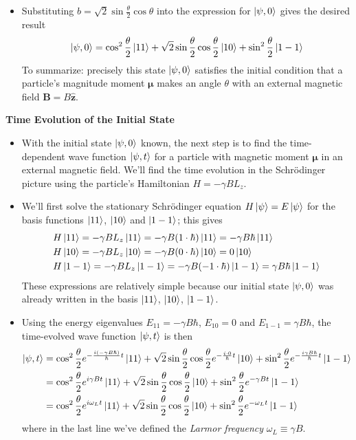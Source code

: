 \documentclass[11pt, a4paper]{article}
\newcommand{\schro}{Schr\"{o}dinger\xspace}
\renewcommand{\vec}[1]{\bm{#1}} %
\newcommand{\uvec}[1]{\hat{\vec{#1}}} %
\newcommand{\m}{\vec{\mu}}  %
\begin{document}
\begin{itemize}
	\item Substituting $ b = \sqrt{2}\sin \frac{\theta}{2} \cos \theta $ into the expression for $ \ket{\psi, 0} $ gives the desired result
	\begin{equation*}
		\ket{\psi, 0} = \cos^{2} \frac{\theta}{2} \ket{11} + \sqrt{2}\sin \frac{\theta}{2} \cos \frac{\theta}{2} \ket{10} + \sin^{2}\frac{\theta}{2} \ket{1 -1}
	\end{equation*}
	To summarize: precisely this state $ \ket{\psi, 0} $ satisfies the initial condition that a particle's magnitude moment $ \m $ makes an angle $ \theta $ with an external magnetic field $ \vec{B} = B \uvec{z} $. 
\end{itemize}

\textbf{Time Evolution of the Initial State}
\begin{itemize}
	\item With the initial state $ \ket{\psi, 0} $ known, the next step is to find the time-dependent wave function $ \ket{\psi, t} $ for a particle with magnetic moment $ \m $ in an external magnetic field. We'll find the time evolution in the \schro picture using the particle's Hamiltonian $ H = -\gamma BL_{z}  $. 
	
	\item We'll first solve the stationary \schro equation $ H \ket{\psi} = E \ket{\psi} $ for the basis functions $ \ket{11} $, $ \ket{10} $ and $ \ket{1-1} $; this gives
	\begin{align*}
		&H \ket{11} = - \gamma BL_{z}\ket{11} = -\gamma B (1\cdot \hbar) \ket{11} = -\gamma B \hbar \ket{11}\\
		&H\ket{10} = - \gamma BL_{z}\ket{10} = -\gamma B (0\cdot \hbar) \ket{10} = 0 \ket{10}\\
		&H \ket{1-1} = - \gamma BL_{z}\ket{1-1} = -\gamma B (-1\cdot \hbar) \ket{1-1} = \gamma B \hbar \ket{1-1}
	\end{align*}
	These expressions are relatively simple because our initial state $ \ket{\psi, 0} $ was already written in the basis $ \ket{11} $, $ \ket{10} $, $ \ket{1-1} $. 
	
	\item Using the energy eigenvalues $ E_{11} = -\gamma B \hbar $, $ E_{10} = 0 $ and $ E_{1-1} = \gamma B \hbar $, the time-evolved wave function $ \ket{\psi, t} $ is then
	\begin{align*}
		\ket{\psi, t} &= \cos^{2} \frac{\theta}{2} e^{-\frac{i(-\gamma B\hbar)}{\hbar}t}\ket{11} + \sqrt{2}\sin \frac{\theta}{2} \cos \frac{\theta}{2} e^{-\frac{i\cdot 0}{\hbar}t}\ket{10} + \sin^{2}\frac{\theta}{2} e^{-\frac{i\gamma B\hbar}{\hbar}t}\ket{1 -1}\\
		&=\cos^{2} \frac{\theta}{2} e^{i\gamma B t}\ket{11} + \sqrt{2}\sin \frac{\theta}{2} \cos \frac{\theta}{2} \ket{10} + \sin^{2}\frac{\theta}{2} e^{-\gamma B t}\ket{1 -1}\\
		&=\cos^{2} \frac{\theta}{2} e^{i \omega_{L} t}\ket{11} + \sqrt{2}\sin \frac{\theta}{2} \cos \frac{\theta}{2} \ket{10} + \sin^{2}\frac{\theta}{2} e^{-\omega_{L} t}\ket{1 -1}
	\end{align*}
	where in the last line we've defined the \textit{Larmor frequency} $ \omega_{L} \equiv \gamma B $. 
	

\end{itemize}
\end{document}
